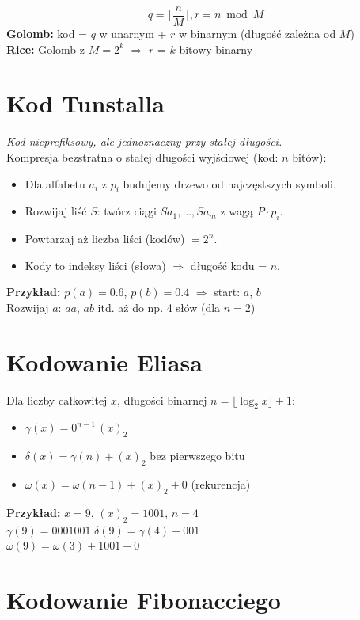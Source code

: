 \documentclass{../konspekt}
\begin{document}
\begin{multicols}{2}
  $$q = \lfloor \frac{n}{M} \rfloor, r = n \bmod M$$
  \textbf{Golomb:} kod = $q$ w unarnym + $r$ w binarnym (długość
  zależna od $M$)\\
  \textbf{Rice:} Golomb z $M = 2^k$ $\Rightarrow$ $r$ = $k$-bitowy binarny

  \section*{Kod Tunstalla}

  \textit{Kod nieprefiksowy, ale jednoznaczny przy stałej długości.}\\
  Kompresja bezstratna o stałej długości wyjściowej (kod: $n$ bitów):

  \begin{itemize}
    \item Dla alfabetu $a_i$ z $p_i$ budujemy drzewo od najczęstszych symboli.
    \item Rozwijaj liść $S$: twórz ciągi $Sa_1, \dots, Sa_m$ z wagą
      $P \cdot p_i$.
    \item Powtarzaj aż liczba liści (kodów) $= 2^n$.
    \item Kody to indeksy liści (słowa) $\Rightarrow$ długość kodu = $n$.
  \end{itemize}
  \textbf{Przykład:} $p(a)=0.6$, $p(b)=0.4$ $\Rightarrow$ start: $a$, $b$\\
  Rozwijaj $a$: $aa$, $ab$ itd. aż do np. 4 słów (dla $n=2$)

  \section*{Kodowanie Eliasa}

  Dla liczby całkowitej $x$, długości binarnej $n = \lfloor \log_2 x
  \rfloor + 1$:
  \begin{itemize}
    \item $\gamma(x) = 0^{n-1} \, (x)_2$
    \item $\delta(x) = \gamma(n) + (x)_2$ bez pierwszego bitu
    \item $\omega(x) = \omega(n-1) + (x)_2 + 0$ (rekurencja)
  \end{itemize}

  \textbf{Przykład:} $x = 9$, $(x)_2 = 1001$, $n = 4$ \\
  $\gamma(9) = 0001001$ \quad $\delta(9) = \gamma(4) + 001$ \\
  $\omega(9) = \omega(3) + 1001 + 0$
  \section*{Kodowanie Fibonacciego}


\end{multicols}
\end{document}
